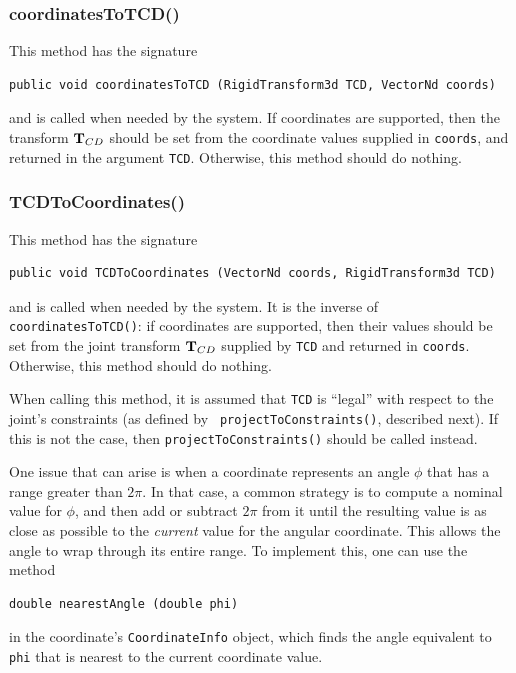 \subsubsection*{coordinatesToTCD()}

This method has the signature
%
\begin{lstlisting}[]
  public void coordinatesToTCD (RigidTransform3d TCD, VectorNd coords)
\end{lstlisting}
%
and is called when needed by the system. If coordinates are supported,
then the transform ${\bf T}_{CD}$ should be set from the coordinate values
supplied in {\tt coords}, and returned in the argument {\tt TCD}.
Otherwise, this method should do nothing.

\subsubsection*{TCDToCoordinates()}

This method has the signature
%
\begin{lstlisting}[]
  public void TCDToCoordinates (VectorNd coords, RigidTransform3d TCD)
\end{lstlisting}
%
and is called when needed by the system. It is the inverse of {\tt
coordinatesToTCD()}: if coordinates are supported, then their values
should be set from the joint transform ${\bf T}_{CD}$ supplied by {\tt TCD}
and returned in {\tt coords}. Otherwise, this method should do
nothing.

When calling this method, it is assumed that {\tt TCD} is ``legal''
with respect to the joint's constraints (as defined by {\tt
projectToConstraints()}, described next). If this is not the case,
then {\tt projectToConstraints()} should be called instead.

One issue that can arise is when a coordinate represents an angle
$\phi$ that has a range greater than $2 \pi$.  In that case, a common
strategy is to compute a nominal value for $\phi$, and then add or
subtract $2 \pi$ from it until the resulting value is as close as
possible to the {\it current} value for the angular coordinate.  This
allows the angle to wrap through its entire range. To implement this,
one can use the method 
%
\begin{lstlisting}[]
  double nearestAngle (double phi)
\end{lstlisting}
%
in the coordinate's {\tt CoordinateInfo} object,
which finds the angle equivalent to {\tt phi} that is nearest to the
current coordinate value.

